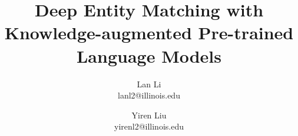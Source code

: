 \documentclass[sigconf, nonacm]{acmart}
\begin{document}
\title{Deep Entity Matching with Knowledge-augmented Pre-trained Language Models}






\author{
  Lan Li \\ 
 lanl2@illinois.edu
  \and
  Yiren Liu \\
  yirenl2@illinois.edu
}








\end{document}
